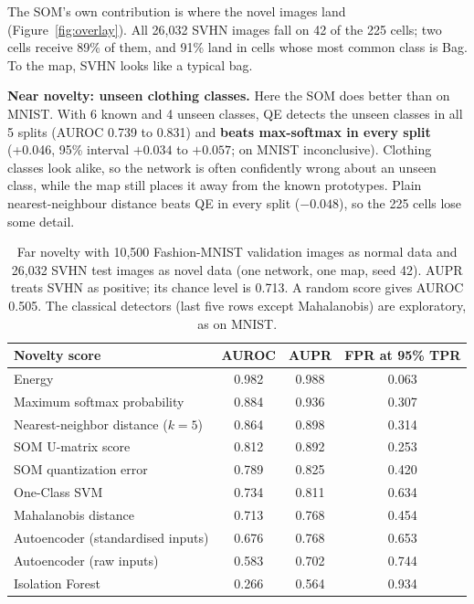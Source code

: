 \documentclass[11pt]{article}
\begin{document}
The SOM's own contribution is where the novel images land (Figure~\ref{fig:overlay}). All 26,032 SVHN images fall on 42 of the 225 cells; two cells receive 89\% of them, and 91\% land in cells whose most common class is Bag. To the map, SVHN looks like a typical bag.

\textbf{Near novelty: unseen clothing classes.} Here the SOM does better than on MNIST. With 6 known and 4 unseen classes, QE detects the unseen classes in all 5 splits (AUROC 0.739 to 0.831) and \textbf{beats max-softmax in every split} (+0.046, 95\% interval $+0.034$ to $+0.057$; on MNIST inconclusive). Clothing classes look alike, so the network is often confidently wrong about an unseen class, while the map still places it away from the known prototypes. Plain nearest-neighbour distance beats QE in every split ($-0.048$), so the 225 cells lose some detail.

\begin{table}[H]
\centering
\renewcommand{\arraystretch}{1.12}
\small
\begin{tabular}{|l|c|c|c|}
\hline
\textbf{Novelty score} & \textbf{AUROC} & \textbf{AUPR} & \textbf{FPR at 95\% TPR} \\ \hline
Energy & 0.982 & 0.988 & 0.063 \\ \hline
Maximum softmax probability & 0.884 & 0.936 & 0.307 \\ \hline
Nearest-neighbor distance ($k=5$) & 0.864 & 0.898 & 0.314 \\ \hline
SOM U-matrix score & 0.812 & 0.892 & 0.253 \\ \hline
SOM quantization error & 0.789 & 0.825 & 0.420 \\ \hline
One-Class SVM & 0.734 & 0.811 & 0.634 \\ \hline
Mahalanobis distance & 0.713 & 0.768 & 0.454 \\ \hline
Autoencoder (standardised inputs) & 0.676 & 0.768 & 0.653 \\ \hline
Autoencoder (raw inputs) & 0.583 & 0.702 & 0.744 \\ \hline
Isolation Forest & 0.266 & 0.564 & 0.934 \\ \hline
\end{tabular}
\caption{Far novelty with 10,500 Fashion-MNIST validation images as normal data and 26,032 SVHN test images as novel data (one network, one map, seed 42). AUPR treats SVHN as positive; its chance level is 0.713. A random score gives AUROC 0.505. The classical detectors (last five rows except Mahalanobis) are exploratory, as on MNIST.}
\label{tab:novelty}
\end{table}
\end{document}

